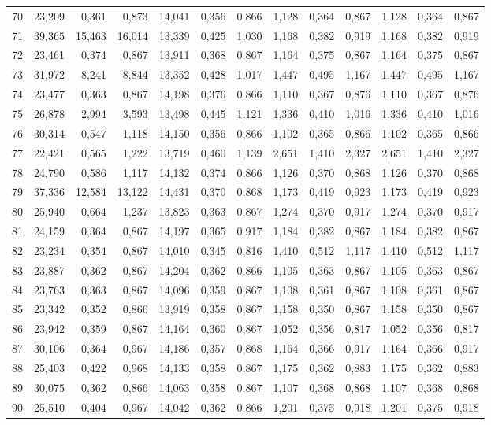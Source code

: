 \begin{longtable}{lrrrrrrrrrrrr}
70 & 23,209 & 0,361 & 0,873 & 14,041 & 0,356 & 0,866 & 1,128 & 0,364 & 0,867 & 1,128 & 0,364 & 0,867 \\
71 & 39,365 & 15,463 & 16,014 & 13,339 & 0,425 & 1,030 & 1,168 & 0,382 & 0,919 & 1,168 & 0,382 & 0,919 \\
72 & 23,461 & 0,374 & 0,867 & 13,911 & 0,368 & 0,867 & 1,164 & 0,375 & 0,867 & 1,164 & 0,375 & 0,867 \\
73 & 31,972 & 8,241 & 8,844 & 13,352 & 0,428 & 1,017 & 1,447 & 0,495 & 1,167 & 1,447 & 0,495 & 1,167 \\
74 & 23,477 & 0,363 & 0,867 & 14,198 & 0,376 & 0,866 & 1,110 & 0,367 & 0,876 & 1,110 & 0,367 & 0,876 \\
75 & 26,878 & 2,994 & 3,593 & 13,498 & 0,445 & 1,121 & 1,336 & 0,410 & 1,016 & 1,336 & 0,410 & 1,016 \\
76 & 30,314 & 0,547 & 1,118 & 14,150 & 0,356 & 0,866 & 1,102 & 0,365 & 0,866 & 1,102 & 0,365 & 0,866 \\
77 & 22,421 & 0,565 & 1,222 & 13,719 & 0,460 & 1,139 & 2,651 & 1,410 & 2,327 & 2,651 & 1,410 & 2,327 \\
78 & 24,790 & 0,586 & 1,117 & 14,132 & 0,374 & 0,866 & 1,126 & 0,370 & 0,868 & 1,126 & 0,370 & 0,868 \\
79 & 37,336 & 12,584 & 13,122 & 14,431 & 0,370 & 0,868 & 1,173 & 0,419 & 0,923 & 1,173 & 0,419 & 0,923 \\
80 & 25,940 & 0,664 & 1,237 & 13,823 & 0,363 & 0,867 & 1,274 & 0,370 & 0,917 & 1,274 & 0,370 & 0,917 \\
81 & 24,159 & 0,364 & 0,867 & 14,197 & 0,365 & 0,917 & 1,184 & 0,382 & 0,867 & 1,184 & 0,382 & 0,867 \\
82 & 23,234 & 0,354 & 0,867 & 14,010 & 0,345 & 0,816 & 1,410 & 0,512 & 1,117 & 1,410 & 0,512 & 1,117 \\
83 & 23,887 & 0,362 & 0,867 & 14,204 & 0,362 & 0,866 & 1,105 & 0,363 & 0,867 & 1,105 & 0,363 & 0,867 \\
84 & 23,763 & 0,363 & 0,867 & 14,096 & 0,359 & 0,867 & 1,108 & 0,361 & 0,867 & 1,108 & 0,361 & 0,867 \\
85 & 23,342 & 0,352 & 0,866 & 13,919 & 0,358 & 0,867 & 1,158 & 0,350 & 0,867 & 1,158 & 0,350 & 0,867 \\
86 & 23,942 & 0,359 & 0,867 & 14,164 & 0,360 & 0,867 & 1,052 & 0,356 & 0,817 & 1,052 & 0,356 & 0,817 \\
87 & 30,106 & 0,364 & 0,967 & 14,186 & 0,357 & 0,868 & 1,164 & 0,366 & 0,917 & 1,164 & 0,366 & 0,917 \\
88 & 25,403 & 0,422 & 0,968 & 14,133 & 0,358 & 0,867 & 1,175 & 0,362 & 0,883 & 1,175 & 0,362 & 0,883 \\
89 & 30,075 & 0,362 & 0,866 & 14,063 & 0,358 & 0,867 & 1,107 & 0,368 & 0,868 & 1,107 & 0,368 & 0,868 \\
90 & 25,510 & 0,404 & 0,967 & 14,042 & 0,362 & 0,866 & 1,201 & 0,375 & 0,918 & 1,201 & 0,375 & 0,918 \\
\end{longtable}
